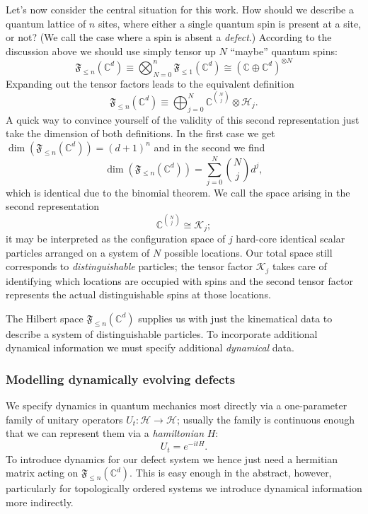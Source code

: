 Let's now consider the central situation for this work. How should we describe a quantum lattice of $n$ sites, where either a single quantum spin is present at a site, or not? (We call the case where a spin is absent a \emph{defect}.) According to the discussion above we should use simply tensor up $N$ ``maybe'' quantum spins:
\begin{equation}
	\mathfrak{F}_{\le n}(\mathbb{C}^d) \equiv \bigotimes_{N=0}^n \mathfrak{F}_{\le 1}(\mathbb{C}^d) \cong (\mathbb{C}\oplus \mathbb{C}^d)^{\otimes N}
\end{equation}
Expanding out the tensor factors leads to the equivalent definition
\begin{equation}
	\mathfrak{F}_{\le n}(\mathbb{C}^d) \equiv \bigoplus_{j=0}^N \mathbb{C}^{\binom{N}{j}}\otimes \mathcal{H}_j.
\end{equation}
A quick way to convince yourself of the validity of this second representation just take the dimension of both definitions. In the first case we get $\dim(\mathfrak{F}_{\le n}(\mathbb{C}^d)) = (d+1)^n$ and in the second we find
\begin{equation}
	\dim(\mathfrak{F}_{\le n}(\mathbb{C}^d)) = \sum_{j=0}^N \binom{N}{j} d^j,
\end{equation}
which is identical due to the binomial theorem. We call the space arising in the second representation
\begin{equation}
	\mathbb{C}^{\binom{N}{j}} \cong \mathcal{K}_{j};
\end{equation}
it may be interpreted as the configuration space of $j$ hard-core identical scalar particles arranged on a system of $N$ possible locations. Our total space still corresponds to \emph{distinguishable} particles; the tensor factor $\mathcal{K}_j$ takes care of identifying which locations are occupied with spins and the second tensor factor represents the actual distinguishable spins at those locations.

The Hilbert space $\mathfrak{F}_{\le n}(\mathbb{C}^d)$ supplies us with just the kinematical data to describe a system of distinguishable particles. To incorporate additional dynamical information we must specify additional \emph{dynamical} data.

\subsubsection{Modelling dynamically evolving defects}
We specify dynamics in quantum mechanics most directly via a one-parameter family of unitary operators $U_t:\mathcal{H}\rightarrow\mathcal{H}$; usually the family is continuous enough that we can represent them via a \emph{hamiltonian} $H$:
\begin{equation}
	U_t = e^{-it H}.
\end{equation}
To introduce dynamics for our defect system we hence just need a hermitian matrix acting on $\mathfrak{F}_{\le n}(\mathbb{C}^d)$. This is easy enough in the abstract, however, particularly for topologically ordered systems we introduce dynamical information more indirectly.

